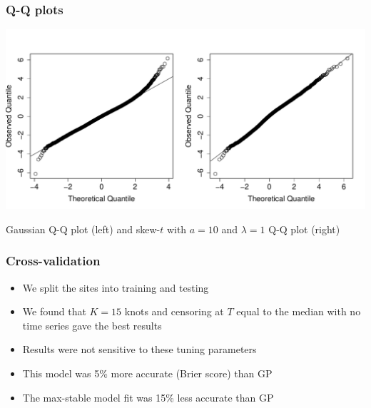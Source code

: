 \documentclass{beamer}
\newcommand{\bit}{\begin{itemize}}
\newcommand{\eit}{\end{itemize}}
\begin{document}
\begin{frame}\frametitle{Q-Q plots}
  \begin{center}
    \includegraphics[width=0.9\textheight]{plots/qq-res}

    Gaussian Q-Q plot (left) and skew-$t$ with $a = 10$ and $\lambda = 1$ Q-Q plot (right)
  \end{center}
\end{frame}

\begin{frame}\frametitle{Cross-validation}
  \bit\setlength\itemsep{\fill}
  \item We split the sites into training and testing
  \item We found that $K=15$ knots and censoring at $T$ equal to the median with no time series gave the best results
  \item Results were not sensitive to these tuning parameters
  \item This model was 5\% more accurate (Brier score) than GP
  \item The max-stable model fit was 15\% less accurate than GP
  \eit
\end{frame}
\end{document}
